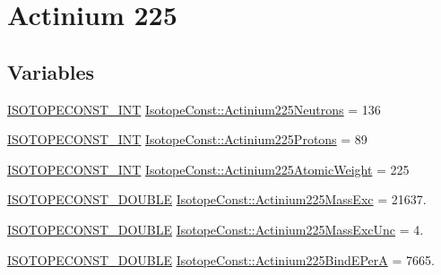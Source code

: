 \hypertarget{group___isotope_const-_actinium-_ac225}{}\section{Actinium 225}
\label{group___isotope_const-_actinium-_ac225}
\subsection*{Variables}
\begin{DoxyCompactItemize}
\item 
\mbox{\hyperlink{group___isotope_const-_macros_ga5f18360b3e99483a35c32d789e62621c}{I\+S\+O\+T\+O\+P\+E\+C\+O\+N\+S\+T\+\_\+\+I\+NT}} \mbox{\hyperlink{group___isotope_const-_actinium-_ac225_ga97b7023052e0a88d072afe584b38b5a4}{Isotope\+Const\+::\+Actinium225\+Neutrons}} = 136
\item 
\mbox{\hyperlink{group___isotope_const-_macros_ga5f18360b3e99483a35c32d789e62621c}{I\+S\+O\+T\+O\+P\+E\+C\+O\+N\+S\+T\+\_\+\+I\+NT}} \mbox{\hyperlink{group___isotope_const-_actinium-_ac225_ga1e6ae191419ec6a4025a73639a84aeb3}{Isotope\+Const\+::\+Actinium225\+Protons}} = 89
\item 
\mbox{\hyperlink{group___isotope_const-_macros_ga5f18360b3e99483a35c32d789e62621c}{I\+S\+O\+T\+O\+P\+E\+C\+O\+N\+S\+T\+\_\+\+I\+NT}} \mbox{\hyperlink{group___isotope_const-_actinium-_ac225_ga6c93227d23eaafc5547d605372c8d12e}{Isotope\+Const\+::\+Actinium225\+Atomic\+Weight}} = 225
\item 
\mbox{\hyperlink{group___isotope_const-_macros_ga8f45a7272ce02c0b4c65c44636ed719a}{I\+S\+O\+T\+O\+P\+E\+C\+O\+N\+S\+T\+\_\+\+D\+O\+U\+B\+LE}} \mbox{\hyperlink{group___isotope_const-_actinium-_ac225_gaae4652ba573fe3f5196ca296dac2936c}{Isotope\+Const\+::\+Actinium225\+Mass\+Exc}} = 21637.
\item 
\mbox{\hyperlink{group___isotope_const-_macros_ga8f45a7272ce02c0b4c65c44636ed719a}{I\+S\+O\+T\+O\+P\+E\+C\+O\+N\+S\+T\+\_\+\+D\+O\+U\+B\+LE}} \mbox{\hyperlink{group___isotope_const-_actinium-_ac225_gaeb2eb640f5aa2d77dbe10c27ae6c2fc3}{Isotope\+Const\+::\+Actinium225\+Mass\+Exc\+Unc}} = 4.
\item 
\mbox{\hyperlink{group___isotope_const-_macros_ga8f45a7272ce02c0b4c65c44636ed719a}{I\+S\+O\+T\+O\+P\+E\+C\+O\+N\+S\+T\+\_\+\+D\+O\+U\+B\+LE}} \mbox{\hyperlink{group___isotope_const-_actinium-_ac225_ga9cb0195ec4d4d41c8d2514b2bc0e4e49}{Isotope\+Const\+::\+Actinium225\+Bind\+E\+PerA}} = 7665.
\item 

\end{DoxyCompactItemize}
